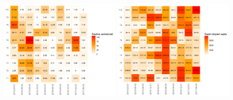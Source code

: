 \documentclass[]{beamer}
\newcommand{\sizequad}{0.45}
\begin{document}
\begin{frame}
\begin{minipage}{\textwidth}
            \includegraphics[width=\sizequad\textwidth]{pictures/srednia_centralnosc/srednia_centralnosc_hm.png}\quad
			\includegraphics[width=\sizequad\textwidth]{pictures/sredni_stopien_wezla/sredni_stopien_wezla_hm.png}
 \end{minipage} 
 
\end{frame}
\end{document}
